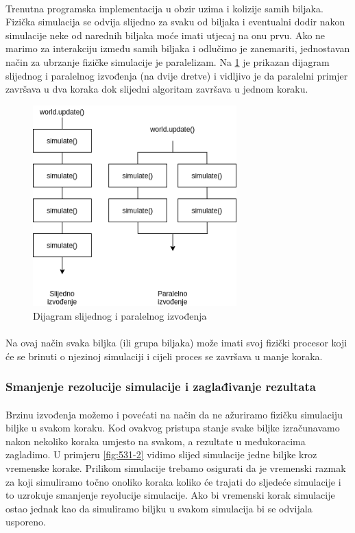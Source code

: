 \documentclass[times, utf8, diplomski]{fer}
\begin{document}
\paragraph{}
Trenutna programska implementacija u obzir uzima i kolizije samih biljaka. 
Fizička simulacija se odvija slijedno za svaku od biljaka i eventualni dodir 
nakon simulacije neke od narednih biljaka moće imati utjecaj na onu prvu. Ako
ne marimo za interakciju između samih biljaka i odlučimo je zanemariti, 
jednostavan način za ubrzanje fizičke simulacije je paralelizam. Na \ref{fig:531-1} je 
prikazan dijagram slijednog i paralelnog izvođenja (na dvije dretve) i vidljivo je da 
paralelni primjer završava u dva koraka dok slijedni algoritam završava u jednom koraku.

\begin{figure}[h]
	\centering
	\includegraphics[width=0.7\textwidth]{img/531-1}
	\caption{Dijagram slijednog i paralelnog izvođenja}
	\label{fig:531-1}
\end{figure}
\paragraph{}
Na ovaj način svaka biljka (ili grupa biljaka) može imati svoj fizički procesor 
koji će se brinuti o njezinoj simulaciji i cijeli proces se završava u manje 
koraka.

\subsubsection{Smanjenje rezolucije simulacije i zaglađivanje rezultata}
\paragraph{}
Brzinu izvođenja možemo i povećati na način da ne ažuriramo fizičku simulaciju 
biljke u svakom koraku. Kod ovakvog pristupa stanje svake biljke izračunavamo 
nakon nekoliko koraka umjesto na svakom, a rezultate u međukoracima zagladimo.
U primjeru \ref{fig:531-2} vidimo slijed simulacije jedne biljke kroz vremenske 
korake. Prilikom simulacije trebamo osigurati da je vremenski razmak za koji 
simuliramo točno onoliko koraka koliko će trajati do sljedeće simulacije i to 
uzrokuje smanjenje reyolucije simulacije. Ako bi vremenski korak simulacije 
ostao jednak kao da simuliramo biljku u svakom simulacija bi se odvijala 
usporeno.
\end{document}
